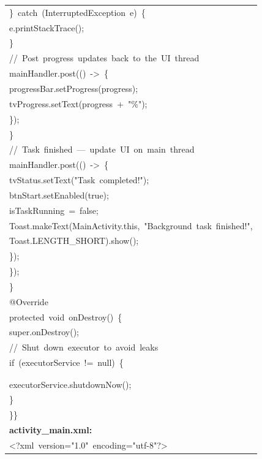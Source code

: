 \documentclass[a4paper,12pt]{article}
\begin{document}
\begin{longtable}{|p{}|}
{\ttfamily\small \}\ catch\ (InterruptedException\ e)\ \{} \\
{\ttfamily\small e.printStackTrace();} \\
{\ttfamily\small \}} \\
{\ttfamily\small //\ Post\ progress\ updates\ back\ to\ the\ UI\ thread} \\
{\ttfamily\small mainHandler.post(()\ -\textgreater{}\ \{} \\
{\ttfamily\small progressBar.setProgress(progress);} \\
{\ttfamily\small tvProgress.setText(progress\ +\ "\%");} \\
{\ttfamily\small \});} \\
{\ttfamily\small \}} \\
{\ttfamily\small //\ Task\ finished\ —\ update\ UI\ on\ main\ thread} \\
{\ttfamily\small mainHandler.post(()\ -\textgreater{}\ \{} \\
{\ttfamily\small tvStatus.setText("Task\ completed!");} \\
{\ttfamily\small btnStart.setEnabled(true);} \\
{\ttfamily\small isTaskRunning\ =\ false;} \\
{\ttfamily\small Toast.makeText(MainActivity.this,\ "Background\ task\ finished!",} \\
{\ttfamily\small Toast.LENGTH\_SHORT).show();} \\
{\ttfamily\small \});} \\
{\ttfamily\small \});} \\
{\ttfamily\small \}} \\
{\ttfamily\small @Override} \\
{\ttfamily\small protected\ void\ onDestroy()\ \{} \\
{\ttfamily\small super.onDestroy();} \\
{\ttfamily\small //\ Shut\ down\ executor\ to\ avoid\ leaks} \\
{\ttfamily\small if\ (executorService\ !=\ null)\ \{} \\
\strut \\
\strut \\
{\ttfamily\small executorService.shutdownNow();} \\
{\ttfamily\small \}} \\
{\ttfamily\small \}\}} \\
\hline
\rule{0pt}{13pt}\textbf{activity\_main.xml:} \\
\hline
{\ttfamily\small \textless{}?xml\ version="1.0"\ encoding="utf-8"?\textgreater{}} \\

\end{longtable}
\end{document}
